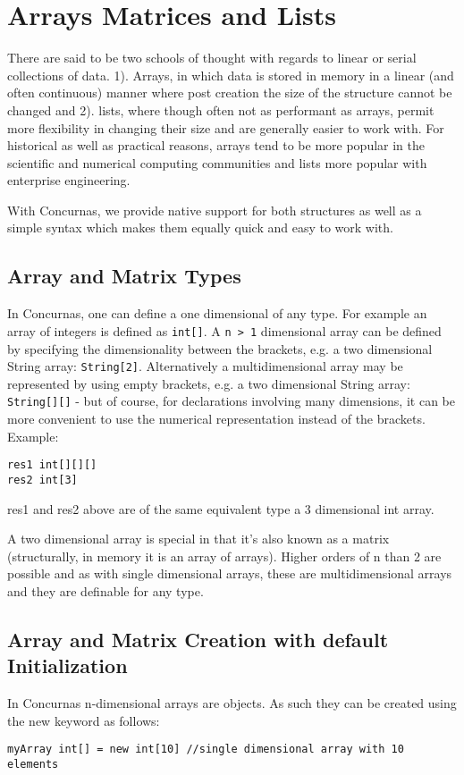 \documentclass[conc-doc]{subfiles}
\begin{document}
	
	\chapter[Arrays Matrices and Lists]{Arrays Matrices and Lists}
	\label{ch:arrays}
There are said to be two schools of thought with regards to linear or serial collections of data. 1). Arrays, in which data is stored in memory in a linear (and often continuous) manner where post creation the size of the structure cannot be changed and 2). lists, where though often not as performant as arrays, permit more flexibility in changing their size and are generally easier to work with. For historical as well as practical reasons, arrays tend to be more popular in the scientific and numerical computing communities and lists more popular with enterprise engineering.

With Concurnas, we provide native support for both structures as well as a simple syntax which makes them equally quick and easy to work with.

\section{Array and Matrix Types}
In Concurnas, one can define a one dimensional of any type. For example an array of integers is defined as \lstinline{int[]}. A \lstinline{n > 1} dimensional array can be defined by specifying the dimensionality between the brackets, e.g. a two dimensional String array: \lstinline{String[2]}. Alternatively a multidimensional array may be represented by using empty brackets, e.g. a two dimensional String array: \lstinline{String[][]} - but of course, for declarations involving many dimensions, it can be more convenient to use the numerical representation instead of the brackets.  Example:

\begin{lstlisting}
res1 int[][][]
res2 int[3]
\end{lstlisting}

res1 and res2 above are of the same equivalent type a 3 dimensional int array.

A two dimensional array is special in that it’s also known as a matrix (structurally, in memory it is an array of arrays). Higher orders of n than 2 are possible and as with single dimensional arrays, these are multidimensional arrays and they are definable for any type.

\section{Array and Matrix Creation with default Initialization}
In Concurnas n-dimensional arrays are objects. As such they can be created using the new keyword as follows:
\begin{lstlisting}
myArray int[] = new int[10] //single dimensional array with 10 elements
\end{lstlisting}
\end{document}
